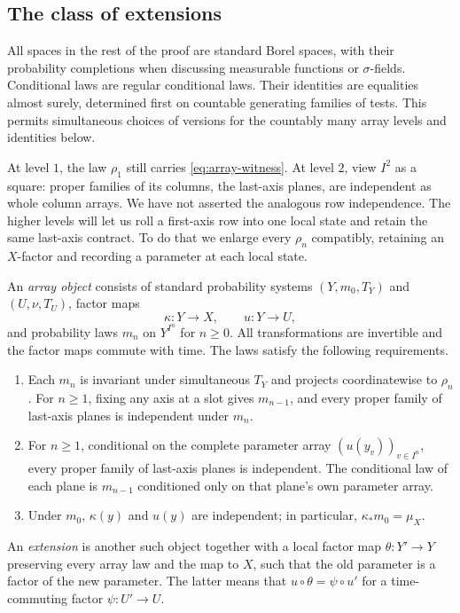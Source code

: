 \subsection{The class of extensions}

All spaces in the rest of the proof are standard Borel spaces, with
their probability completions when discussing measurable functions or
$\sigma$-fields.  Conditional laws are regular conditional laws.  Their
identities are equalities almost surely, determined first on countable
generating families of tests.  This permits simultaneous choices of
versions for the countably many array levels and identities below.

At level $1$, the law $\rho_1$ still carries
\eqref{eq:array-witness}. At level $2$, view $I^2$ as a square: proper
families of its columns, the last-axis planes, are independent as
whole column arrays. We have not asserted the analogous row
independence. The higher levels will let us roll a first-axis row
into one local state and retain the same last-axis contract. To do
that we enlarge every $\rho_n$ compatibly, retaining an $X$-factor and
recording a parameter at each local state.

\begin{definition}\label{def:array-object}
An \emph{array object} consists of standard probability systems
$(Y,m_0,T_Y)$ and $(U,\nu,T_U)$, factor maps
\[
 \kappa:Y\longrightarrow X,\qquad u:Y\longrightarrow U,
\]
and probability laws $m_n$ on $Y^{I^n}$ for $n\geq0$.  All
transformations are invertible and the factor maps commute with time.
The laws satisfy the following requirements.
\begin{enumerate}
\item Each $m_n$ is invariant under simultaneous $T_Y$ and projects
coordinatewise to $\rho_n$.  For $n\geq1$, fixing any axis at a slot
gives $m_{n-1}$, and every proper family of last-axis planes is
independent under $m_n$.
\item For $n\geq1$, conditional on the complete parameter array
$(u(y_v))_{v\in I^n}$, every proper family of last-axis planes is
independent.  The conditional law of each plane is $m_{n-1}$
conditioned only on that plane's own parameter array.
\item Under $m_0$, $\kappa(y)$ and $u(y)$ are independent; in particular,
$\kappa_*m_0=\mu_X$.
\end{enumerate}
An \emph{extension} is another such object together with a local factor
map $\theta:Y'\to Y$ preserving every array law and the map to $X$,
such that the old parameter is a factor of the new parameter.  The latter
means that $u\circ\theta=\psi\circ u'$ for a time-commuting factor
$\psi:U'\to U$.
\end{definition}

